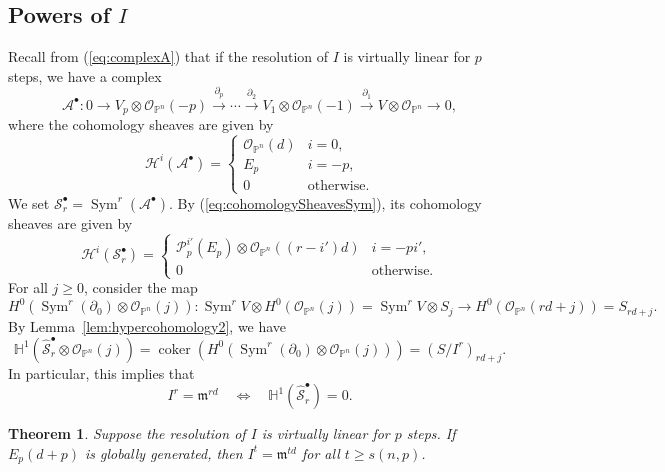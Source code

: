 \documentclass[11pt,letterpaper,reqno]{amsart}
\newcommand{\m}{\mathfrak{m}}
\newcommand{\Sym}{\operatorname{Sym}}
\newcommand{\coker}{\operatorname{coker}}
\newcommand{\mc}[1]{\mathcal{#1}}
\def\PP{{\mathbb P}}
\def\lra{\longrightarrow}
\newtheorem{theorem}{Theorem}[section]
\theoremstyle{definition}
\numberwithin{equation}{section}
\begin{document}
\subsection{Powers of $I$} Recall from (\ref{eq:complexA}) that if the resolution of $I$ is virtually linear for $p$ steps, we have a complex
\[\mc{A}^\bullet \colon 0 \lra V_p\otimes \mc{O}_{\PP^n}(-p) \overset{\partial_p}{\lra} \cdots \overset{\partial_2}{\lra}  V_1 \otimes \mc{O}_{\PP^n}(-1) \overset{\partial_1}{\lra} V \otimes \mc{O}_{\PP^n} \lra 0, \]
where the cohomology sheaves are given by
\[\mc{H}^i (\mc{A}^\bullet) = \begin{cases}
    \mc{O}_{\PP^n}(d) & i = 0,\\
    E_p & i = -p,\\
    0 &\text{otherwise.}
\end{cases}\]
We set $\mc{S}^\bullet_r = \Sym^r(\mc{A}^\bullet)$. By (\ref{eq:cohomologySheavesSym}), its cohomology sheaves are given by
\[\mc{H}^i (\mc{S}^\bullet_r) = \begin{cases}
    \mc{P}^{i'}_p(E_p) \otimes \mc{O}_{\PP^n}((r-i')d) & i = -pi',\\
    0 &\text{otherwise.}
\end{cases}\]
For all $j\ge 0$, consider the map
\[H^0(\Sym^r(\partial_0) \otimes \mc{O}_{\PP^n}(j))\colon \Sym^r V \otimes H^0(\mc{O}_{\PP^n}(j)) = \Sym^r V \otimes S_j \lra H^0(\mc{O}_{\PP^n}(rd+j)) = S_{rd+j}.\]
By Lemma~\ref{lem:hypercohomology2}, we have
\begin{equation}\label{eq:H1hilbertfunction}
    \mathbb{H}^1(\widehat{\mc{S}}^\bullet_r\otimes \mc{O}_{\PP^n}(j)) = \coker(H^0(\Sym^r(\partial_0)\otimes \mc{O}_{\PP^n}(j))) = (S/I^r)_{rd+j}.
\end{equation}
In particular, this implies that
\begin{equation}\label{eq:equalityiffH1vanishing}
    I^r = \m^{rd} \quad \iff \quad \mathbb{H}^1(\widehat{\mc{S}}^\bullet_r) = 0.
\end{equation}
\begin{theorem}\label{thm:powers}
    Suppose the resolution of $I$ is virtually linear for $p$ steps. If $E_p(d+p)$ is globally generated, then $I^{t} = \m^{td}$ for all $t \ge s(n,p)$.
\end{theorem}
\end{document}
